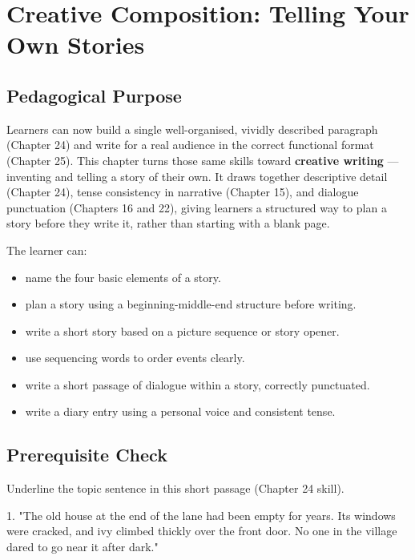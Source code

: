 
\chapter{Creative Composition: Telling Your Own Stories}

\section{Pedagogical Purpose}
Learners can now build a single well-organised, vividly described paragraph (Chapter 24) and write for a real audience in the correct functional format (Chapter 25). This chapter turns those same skills toward \textbf{creative writing} — inventing and telling a story of their own. It draws together descriptive detail (Chapter 24), tense consistency in narrative (Chapter 15), and dialogue punctuation (Chapters 16 and 22), giving learners a structured way to plan a story before they write it, rather than starting with a blank page.

\begin{learningobjectives}
The learner can:
\begin{itemize}
    \item name the four basic elements of a story.
    \item plan a story using a beginning-middle-end structure before writing.
    \item write a short story based on a picture sequence or story opener.
    \item use sequencing words to order events clearly.
    \item write a short passage of dialogue within a story, correctly punctuated.
    \item write a diary entry using a personal voice and consistent tense.
\end{itemize}
\end{learningobjectives}

\section{Prerequisite Check}
\begin{quickcheck}
Underline the topic sentence in this short passage (Chapter 24 skill).

1. "The old house at the end of the lane had been empty for years. Its windows were cracked, and ivy climbed thickly over the front door. No one in the village dared to go near it after dark."
\end{quickcheck}

